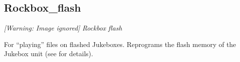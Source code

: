 \subsection{Rockbox\_flash}
{\centering\itshape
  [Warning: Image ignored] %
 \newline
Rockbox flash
\par}

For ``playing''  files on flashed Jukeboxes. Reprograms the flash memory of
the Jukebox unit (see  for details).


